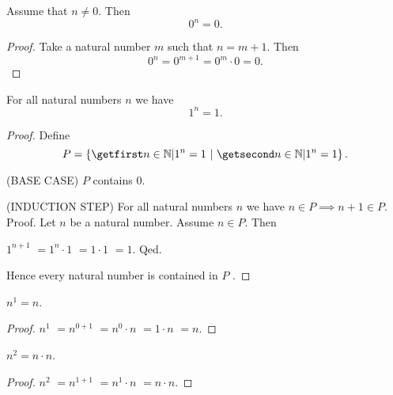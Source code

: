 \documentclass[../../arithmetic.tex]{subfiles}
\begin{document}
  \begin{forthel}
    \begin{proposition}\label{Arithmetic_01_04_876526}
      Assume that $n \neq 0$.
      Then \[ 0^{n} = 0. \]
    \end{proposition}
    \begin{proof}
      Take a natural number $m$ such that $n = m + 1$.
      Then
      \[
          0^{n}
        = 0^{m + 1}       %
        = 0^{m} \cdot 0   %
        = 0.              %
      \]
    \end{proof}


    \begin{proposition}\label{Arithmetic_01_04_577060}
      For all natural numbers $n$ we have \[ 1^{n} = 1. \]
    \end{proposition}
    \begin{proof}
      Define \[ P = \class{n \in \Nat | 1^{n} = 1}. \]

      (BASE CASE) $P$ contains $0$.

      (INDUCTION STEP) For all natural numbers $n$ we have $n \in P \implies n + 1 \in P$. \\
      Proof.
        Let $n$ be a natural number.
        Assume $n \in P$.
        Then

        $  1^{n + 1}$
        $= 1^{n} \cdot 1$   %
        $= 1 \cdot 1$       %
        $= 1$.              %
      Qed.

      Hence every natural number is contained in $P$ .
    \end{proof}


    \begin{proposition}\label{Arithmetic_01_04_848167}
      $n^{1} = n$.
    \end{proposition}
    \begin{proof}
      $  n^{1}$
      $= n^{0 + 1}$       %
      $= n^{0} \cdot n$   %
      $= 1 \cdot n$       %
      $= n$.              %
    \end{proof}


    \begin{proposition}\label{Arithmetic_01_04_846549}
      $n^{2} = n \cdot n$.
    \end{proposition}
    \begin{proof}
      $  n^{2}$
      $= n^{1 + 1}$       %
      $= n^{1} \cdot n$   %
      $= n \cdot n$.      %
    \end{proof}
  \end{forthel}
\end{document}
